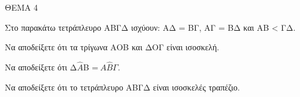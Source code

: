 
ΘΕΜΑ 4

Στο παρακάτω τετράπλευρο ΑΒΓΔ ισχύουν: ΑΔ = ΒΓ, ΑΓ = ΒΔ και ΑΒ \textless{} ΓΔ.

\begin{alist}
\item Να αποδείξετε ότι τα τρίγωνα ΑΟΒ και ΔΟΓ είναι ισοσκελή. 

\item Να αποδείξετε ότι Δ$\widehat{Α}$B =$\ Α\widehat{Β}\Gamma$. 

\item Να αποδείξετε ότι το τετράπλευρο ΑΒΓΔ είναι ισοσκελές τραπέζιο. 


\end{alist}

